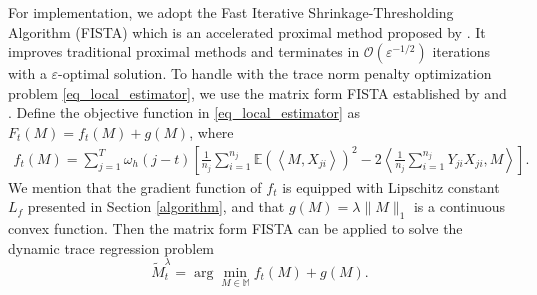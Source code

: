\documentclass[12pt]{article}
\begin{document}
  For implementation, we adopt the Fast Iterative Shrinkage-Thresholding Algorithm (FISTA) which is an accelerated proximal method proposed by \cite{beck2009fast}. It improves traditional proximal methods and terminates in $\mathcal{O}(\varepsilon^{-1/2})$ iterations with a $\varepsilon$-optimal solution. %
  To handle with the trace norm penalty optimization problem \eqref{eq_local_estimator}, we use the matrix form FISTA established by \cite{ji2009accelerated} and \cite{toh2010accelerated}. %
  Define the objective function in \eqref{eq_local_estimator} as 
  $F_t(M) = f_t(M)+g(M)$, where 
  \begin{align*}
    f_t(M) = \sum_{j=1}^T \omega_h(j-t) \left[\frac{1}{n_j}\sum_{i=1}^{n_j}\mathbb{E}(\left\langle M,X_{ji}\right\rangle)^2 - 2\left\langle\frac{1}{n_j}\sum_{i=1}^{n_j}Y_{ji}X_{ji}, M \right\rangle\right].
  \end{align*}
  We mention that the gradient function of $f_t$ is equipped with Lipschitz constant $L_f$ presented in Section \ref{algorithm}, and that $g(M) = \lambda \|M\|_1$ is a continuous convex function. 
  Then the matrix form FISTA can be applied to solve the dynamic trace regression problem $$\widetilde{M}^\lambda_t = \arg\min_{M\in \mathbb{M}} f_t(M)+g(M).$$ 
  
\end{document}
